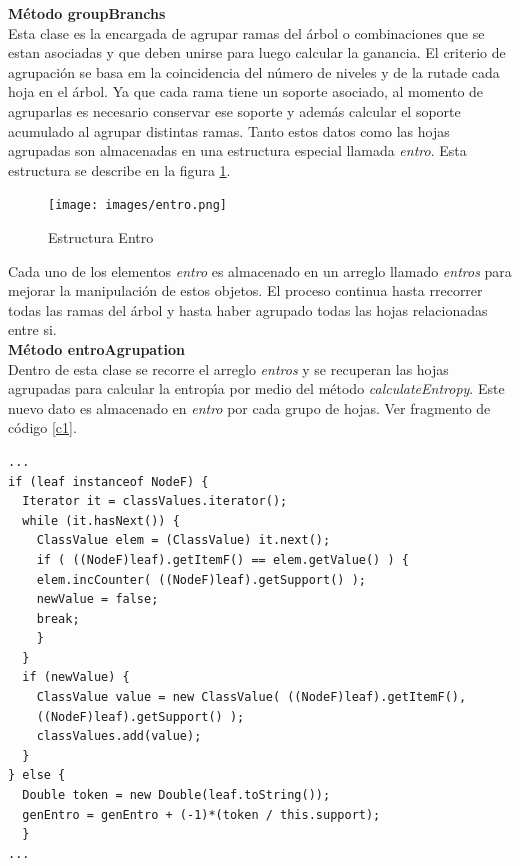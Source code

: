\textbf{M\'etodo groupBranchs}\\
Esta clase es la encargada de agrupar ramas del \'arbol o combinaciones que se estan asociadas y que deben unirse
para luego calcular la ganancia. El criterio de agrupaci\'on se basa em la coincidencia del n\'umero de niveles y
de la rutade cada hoja  en el \'arbol. Ya que cada rama tiene un soporte asociado, al momento de agruparlas es
necesario conservar ese soporte y adem\'as calcular el soporte acumulado al agrupar distintas ramas. Tanto estos
datos como las hojas agrupadas son almacenadas en una estructura especial llamada \textit{entro}. Esta estructura
se describe en la figura \ref{f2}.

\begin{figure}[h]
\centering
\texttt{[image: images/entro.png]}
\caption{Estructura Entro}
\label{f2}
\end{figure}

Cada uno de los elementos \textit{entro} es almacenado en un arreglo llamado \textit{entros} para mejorar la
manipulaci\'on de estos objetos. El proceso continua hasta rrecorrer todas las ramas del \'arbol y hasta haber
agrupado todas las hojas relacionadas entre si.\\

\textbf{M\'etodo entroAgrupation}\\
Dentro de esta clase se recorre el arreglo \textit{entros} y se recuperan las hojas agrupadas para calcular la
entrop\'\i{}a por medio del m\'etodo \textit{calculateEntropy}. Este nuevo dato es almacenado en \textit{entro}
por cada grupo de hojas. Ver fragmento de c\'odigo \ref{c1}.\\

\begin{codigof}
\begin{verbatim}
...
if (leaf instanceof NodeF) {
  Iterator it = classValues.iterator();
  while (it.hasNext()) {
    ClassValue elem = (ClassValue) it.next();
    if ( ((NodeF)leaf).getItemF() == elem.getValue() ) {
    elem.incCounter( ((NodeF)leaf).getSupport() );
    newValue = false;
    break;
    }
  }
  if (newValue) {
    ClassValue value = new ClassValue( ((NodeF)leaf).getItemF(),
    ((NodeF)leaf).getSupport() );
    classValues.add(value);
  }
} else {
  Double token = new Double(leaf.toString());
  genEntro = genEntro + (-1)*(token / this.support);
  }
...
\end{verbatim}
\caption{C\'alculo de Entrop\'\i{}a}
\label{c1}
\end{codigof}

